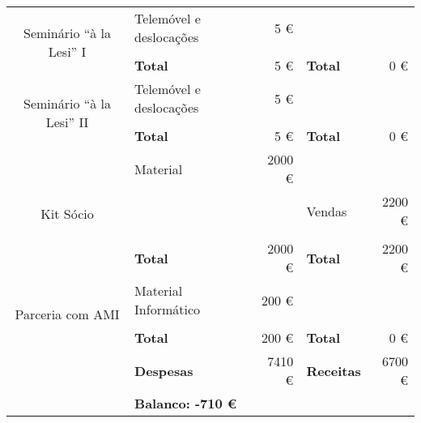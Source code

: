 \begin{center}
{\begin{tabular}{| c | l | r | l | r |}
\multirow{3}{*}{Seminário “à la Lesi” I}
							& Telemóvel e deslocações & 5 \euro		&  								& 					\\ \cline{2-5}
							&						&				&								&					\\ \cline{2-5}
							& \textbf{Total}		& 5 \euro		& \textbf{Total}				& 0 \euro			\\ \cline{1-5} \hline
							
\multirow{3}{*}{Seminário “à la Lesi” II}
							& Telemóvel e deslocações & 5 \euro		&  								& 					\\ \cline{2-5}
							&						&				&								&					\\ \cline{2-5}
							& \textbf{Total}		& 5 \euro		& \textbf{Total}				& 0 \euro			\\ \cline{1-5} \hline

\multirow{4}{*}{Kit Sócio}
							& Material				& 2000 \euro	& 								&					\\ \cline{2-5}
							&						&				& Vendas						& 2200 \euro		\\ \cline{2-5}
							&						&				&								&					\\ \cline{2-5}
							& \textbf{Total}		& 2000 \euro	& \textbf{Total}				& 2200 \euro		\\ \cline{1-5} \hline

\multirow{3}{*}{Parceria com AMI}
							& Material Informático	& 200 \euro		& 								&					\\ \cline{2-5}
							&						&				&								&					\\ \cline{2-5}
							& \textbf{Total}		& 200 \euro		& \textbf{Total}				& 0 \euro			\\ \cline{1-5} \hline

\hline
							& \textbf{Despesas}		& 7410 \euro	& \textbf{Receitas}				& 6700 \euro		\\ \hline
							& \multicolumn{4}{|l|}{\textbf{Balanco: -710 \euro}}															\\ \hline
\end{tabular}
}

\end{center}

